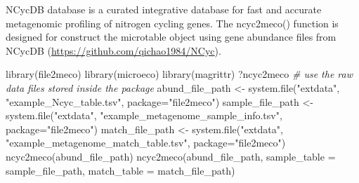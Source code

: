 \documentclass[
]{book}
\newenvironment{Shaded}{\begin{snugshade}}{\end{snugshade}}
\newcommand{\AttributeTok}[1]{\textcolor[rgb]{0.77,0.63,0.00}{#1}}
\newcommand{\CommentTok}[1]{\textcolor[rgb]{0.56,0.35,0.01}{\textit{#1}}}
\newcommand{\FunctionTok}[1]{\textcolor[rgb]{0.00,0.00,0.00}{#1}}
\newcommand{\NormalTok}[1]{#1}
\newcommand{\OtherTok}[1]{\textcolor[rgb]{0.56,0.35,0.01}{#1}}
\newcommand{\StringTok}[1]{\textcolor[rgb]{0.31,0.60,0.02}{#1}}
\begin{document}
NCycDB database \citep{Tu_NCycDB_2018} is a curated integrative database for fast and accurate metagenomic profiling of nitrogen cycling genes.
The ncyc2meco() function is designed for construct the microtable object using gene abundance files from NCycDB (\url{https://github.com/qichao1984/NCyc}).

\begin{Shaded}
\begin{Highlighting}[]
\FunctionTok{library}\NormalTok{(file2meco)}
\FunctionTok{library}\NormalTok{(microeco)}
\FunctionTok{library}\NormalTok{(magrittr)}
\NormalTok{?ncyc2meco}
\CommentTok{\# use the raw data files stored inside the package}
\NormalTok{abund\_file\_path }\OtherTok{\textless{}{-}} \FunctionTok{system.file}\NormalTok{(}\StringTok{"extdata"}\NormalTok{, }\StringTok{"example\_Ncyc\_table.tsv"}\NormalTok{, }\AttributeTok{package=}\StringTok{"file2meco"}\NormalTok{)}
\NormalTok{sample\_file\_path }\OtherTok{\textless{}{-}} \FunctionTok{system.file}\NormalTok{(}\StringTok{"extdata"}\NormalTok{, }\StringTok{"example\_metagenome\_sample\_info.tsv"}\NormalTok{, }\AttributeTok{package=}\StringTok{"file2meco"}\NormalTok{)}
\NormalTok{match\_file\_path }\OtherTok{\textless{}{-}} \FunctionTok{system.file}\NormalTok{(}\StringTok{"extdata"}\NormalTok{, }\StringTok{"example\_metagenome\_match\_table.tsv"}\NormalTok{, }\AttributeTok{package=}\StringTok{"file2meco"}\NormalTok{)}
\FunctionTok{ncyc2meco}\NormalTok{(abund\_file\_path)}
\FunctionTok{ncyc2meco}\NormalTok{(abund\_file\_path, }\AttributeTok{sample\_table =}\NormalTok{ sample\_file\_path, }\AttributeTok{match\_table =}\NormalTok{ match\_file\_path)}
\end{Highlighting}
\end{Shaded}
\end{document}
